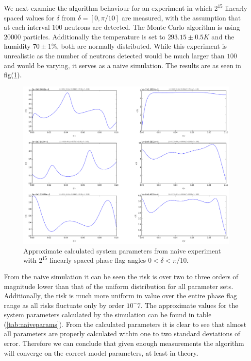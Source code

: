 We next examine the algorithm behaviour for an experiment in which $2^15$ linearly spaced values for $\delta$ from $\delta=[0,\pi/10]$ are measured, with the assumption that at each interval $100$ neutrons are detected. The Monte Carlo algorithm is using $20000$ particles. Additionally the temperature is set to $293.15\pm0.5K$ and the humidity $70\pm1\%$, both are normally distributed. While this experiment is unrealistic as the number of neutrons detected would be much larger than $100$ and would be varying, it serves as a naive simulation. The results are as seen in fig(\ref{fig:naiverisks}). 
\begin{figure}[ht!]
\centering
\includegraphics[width=\textwidth , height=0.8\textheight]{Figures/naiverisk.png}
\caption{Approximate calculated system parameters from naive experiment with $2^{15}$ linearly spaced phase flag angles $0<\delta<\pi/10$.}
\label{fig:naiverisks}
\end{figure}
From the naive simulation it can be seen the risk is over two to three orders of magnitude lower than that of the uniform distribution for all parameter sets. Additionally, the risk is much more uniform in value over the entire phase flag range as all risks fluctuate only by order $10^-7$. The approximate values for the system parameters calculated by the simulation can be found in table (\ref{tab:naiveparams}). From the calculated parameters it is clear to see that almost all parameters are properly calculated within one to two standard deviations of error. Therefore we can conclude that given enough measurements the algorithm will converge on the correct model parameters, at least in theory.

